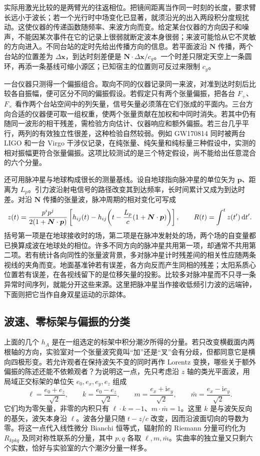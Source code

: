 实际用激光比较的是两臂光的往返相位。把镜间距离当作同一时刻的长度，要求臂长远小于波长；若一个光行时中场变化已显著，就须沿光的出入两段积分度规扰动。这使仪器的传递函数随频率、来波方向而变。给定某台仪器的方向因子和噪声，不能因某次事件在它的记录上很弱就断定波本身很弱；来波可能恰从它不灵敏的方向进入。不同台站的定时先给出传播方向的信息。若平面波沿 $\bm N$ 传播，两个台站的位置差为 $\Delta\bm x$，到达时刻差便是 $\bm N\cdot\Delta\bm x/c_g$。一个时差只限定天空上一条圆环，再添一条基线可缩小源区；已知宿主的位置则可反过来限制 $c_g$。

一台仪器只测得一个偏振组合。取向不同的仪器记录同一来波，对准到达时刻后比较各自振幅，便可区分不同的偏振假设。若假定只有两个张量偏振，把各台 $F_+$、$F_\times$ 看作两个台站空间中的列矢量，信号矢量必须落在它们张成的平面内。三台方向合适的仪器便可取一组权重，使两个张量贡献在加权和中同时消失。若其中仍有随同一波形的相干残差，需检验方向估计、仪器响应和额外偏振。若三台几乎平行，两列的有效独立性很差，这种检验自然较弱。例如 GW170814 同时被两台 LIGO 和一台 Virgo 干涉仪记录，在纯张量、纯矢量和纯标量三种假设中，实测的相对振幅更符合张量偏振。这项比较测试的是三个特定假设，尚不能给出任意混合的六个分量。

还可用脉冲星与地球构成很长的测量基线。设自地球指向脉冲星的单位矢为 $\bm p$、距离为 $L_p$。引力波沿射电信号的路径改变其到达频率，长时间累计又成为到达时差。对沿 $\bm N$ 传播的张量波，脉冲周期的相对变化可写成
\[
 z(t)=\frac{p^ip^j}{2(1+\bm N\cdot\bm p)}
 \left[h_{ij}(t)-h_{ij}\!\left(t-\frac{L_p}{c}(1+\bm N\cdot\bm p)\right)\right],
 \qquad R(t)=\int^t z(t')\,\dd t'.
\]
括号第一项是在地球接收时的场，第二项是在脉冲发射处的场，两个场的自变量都已换算成波在地球处的相位。许多不同方向的脉冲星共用第一项，却通常不共用第二项。若有统计各向同性的张量波背景，多对脉冲星计时残差间的相关性应随两条视线的夹角而变。地面基准钟若有误差，各方向反而产生同相的残差；太阳系质心位置若有误差，在各视线留下的是位移矢量的投影。比较多对脉冲星而不只寻一条异常时间序列，就能分开这些来源。这里把脉冲星当作接收低频引力波的远端钟，下面则把它当作自身双星运动的示踪体。

\subsection{波速、零标架与偏振的分类}

上面的几个 $h_A$ 是在一组选定的标架中积分潮汐所得的分量。若只改变横截面内两根轴的方向，实验室对一个张量波究竟叫“加”还是“叉”会有分歧，但都同意它是横向四极形变。若允许观者在保持波矢不变的同时再作 Lorentz 变换，哪些关于额外偏振的陈述还能不依赖观者？为说明这一点，先只考虑沿 $z$ 轴的类光平面波，用局域正交标架的单位矢 $e_0,e_x,e_y,e_z$ 组成
\[
 \ell=\frac{e_0+e_z}{\sqrt2},\qquad
 k=\frac{e_0-e_z}{\sqrt2},\qquad
 m=\frac{e_x+\mathrm i e_y}{\sqrt2},\qquad
 \bar m=\frac{e_x-\mathrm i e_y}{\sqrt2}.
\]
它们均为零矢量，非零的内积只有 $\ell\cdot k=-1$、$m\cdot\bar m=1$。这里 $k$ 是与波矢反向的基矢，波矢本身沿 $\ell$。波各分量只随 $t-z/c$ 改变，因而沿波面切向的导数为零。将这一点代入线性微分 Bianchi 恒等式，辐射阶的 Riemann 分量可约化为 $R_{kpkq}$ 及同对称性联系的分量，其中 $p,q$ 各取 $\ell,m,\bar m$。实曲率的独立量又只剩六个实数，恰好与实验室的六个潮汐分量一样多。

